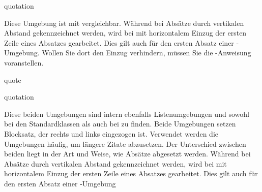     \begin{Declaration}
      \begin{Environment}{quotation}\end{Environment}
    \end{Declaration}%
    Diese
    Umgebung ist mit
     vergleichbar. Während bei
     Absätze durch vertikalen Abstand
    gekennzeichnet werden, wird bei  mit horizontalem
    Einzug der ersten Zeile eines Absatzes gearbeitet. Dies gilt auch für den
    ersten Absatz einer -Umgebung. Wollen Sie dort den
    Einzug verhindern, müssen Sie die
    -Anweisung voranstellen.%
    \else %
    \begin{Declaration}
      \begin{Environment}{quote}\end{Environment}
      \begin{Environment}{quotation}\end{Environment}
    \end{Declaration}%
    Diese beiden
    Umgebungen sind intern ebenfalls Listenumgebungen
    und sowohl bei den Standardklassen als auch bei {\KOMAScript} zu finden.
    Beide Umgebungen setzen Blocksatz, der rechts und links eingezogen
    ist. Verwendet werden die Umgebungen häufig, um längere
    Zitate abzusetzen. Der Unterschied zwischen beiden liegt in
    der Art und Weise, wie Absätze abgesetzt werden. Während bei
     Absätze durch vertikalen Abstand gekennzeichnet
    werden, wird bei  mit horizontalem Einzug der
    ersten Zeile eines Absatzes gearbeitet. Dies gilt auch für den ersten
    Absatz einer -Umgebung%
    \fi %
